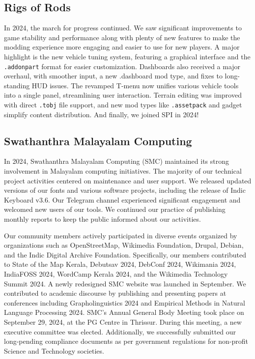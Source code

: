 \documentclass[a4paper]{report}
\begin{document}
\subsection{Rigs of Rods}

In 2024, the march for progress continued. We saw significant improvements to game stability and performance along with plenty of new features to make the modding experience more engaging and easier to use for new players. A major highlight is the new vehicle tuning system, featuring a graphical interface and the {\tt .addonpart} format for easier customization. Dashboards also received a major overhaul, with smoother input, a new .dashboard mod type, and fixes to long-standing HUD issues. The revamped T-menu now unifies various vehicle tools into a single panel, streamlining user interaction. Terrain editing was improved with direct {\tt .tobj} file support, and new mod types like {\tt .assetpack} and gadget simplify content distribution. And finally, we joined SPI in 2024!

\subsection{Swathanthra Malayalam Computing}

In 2024, Swathanthra Malayalam Computing (SMC) maintained its strong involvement in Malayalam computing initiatives. The majority of our technical project activities centered on maintenance and user support. We released updated versions of our fonts and various software projects, including the release of Indic Keyboard v3.6. Our Telegram channel experienced significant engagement and welcomed new users of our tools. We continued our practice of publishing monthly reports to keep the public informed about our activities.

Our community members actively participated in diverse events organized by organizations such as OpenStreetMap, Wikimedia Foundation, Drupal, Debian, and the Indic Digital Archive Foundation. Specifically, our members contributed to State of the Map Kerala, Debutsav 2024, DebConf 2024, Wikimania 2024, IndiaFOSS 2024, WordCamp Kerala 2024, and the Wikimedia Technology Summit 2024. A newly redesigned SMC website was launched in September. We contributed to academic discourse by publishing and presenting papers at conferences including Grapholinguistics 2024 and Empirical Methods in Natural Language Processing 2024. SMC's Annual General Body Meeting took place on September 29, 2024, at the PG Centre in Thrissur. During this meeting, a new executive committee was elected. Additionally, we successfully submitted our long-pending compliance documents as per government regulations for non-profit Science and Technology societies.
\end{document}
